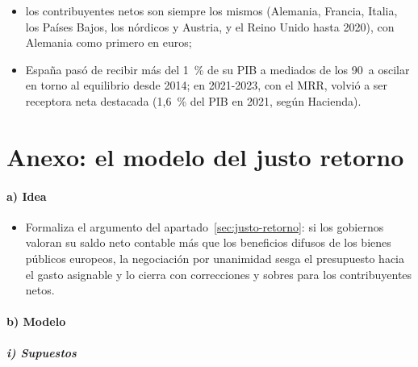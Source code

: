 \documentclass[11pt]{article}
\begin{document}
\begin{itemize}
\begin{itemize}
  \item los contribuyentes netos son siempre los mismos (Alemania, Francia, Italia, los Países Bajos, los nórdicos y Austria, y el Reino Unido hasta 2020), con Alemania como primero en euros;
  \item España pasó de recibir más del 1~\% de su PIB a mediados de los 90~a oscilar en torno al equilibrio desde 2014; en 2021-2023, con el MRR, volvió a ser receptora neta destacada (1,6~\% del PIB en 2021, según Hacienda)\nocite{Hacienda2026RelacionesFinancieras}.
  \end{itemize}
\end{itemize}

\section{Anexo: el modelo del justo retorno}\label{anexo:justo-retorno}

\paragraph{a) Idea}

\begin{itemize}
\item Formaliza el argumento del apartado~\ref{sec:justo-retorno}: si los gobiernos valoran su saldo neto contable más que los beneficios difusos de los bienes públicos europeos, la negociación por unanimidad sesga el presupuesto hacia el gasto asignable y lo cierra con correcciones y sobres para los contribuyentes netos.
\end{itemize}

\paragraph{b) Modelo}

\subparagraph{i) Supuestos}
\end{document}
